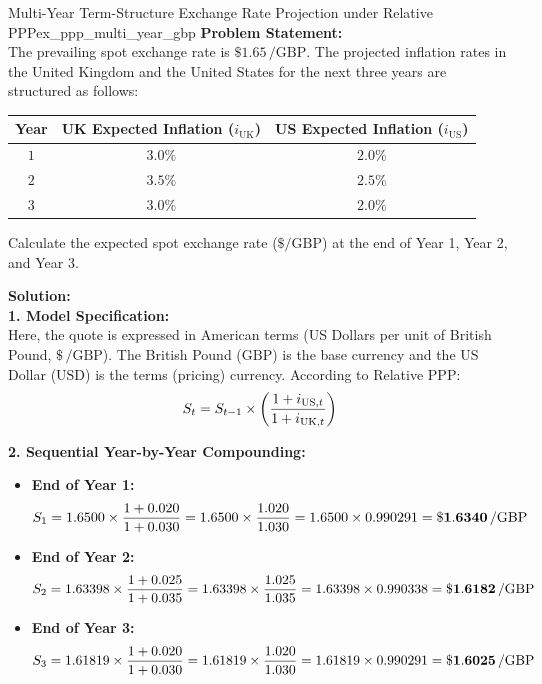 \clearpage
\begin{example}{Multi-Year Term-Structure Exchange Rate Projection under Relative PPP}{ex_ppp_multi_year_gbp}
\textbf{Problem Statement:}\\
The prevailing spot exchange rate is $\$1.65\,/\text{GBP}$. The projected inflation rates in the United Kingdom and the United States for the next three years are structured as follows:
\begin{center}
\small
\begin{tabular}{ccc}
    \toprule
    \textbf{Year} & \textbf{UK Expected Inflation ($i_{\text{UK}}$)} & \textbf{US Expected Inflation ($i_{\text{US}}$)} \\
    \midrule
    $1$ & $3.0\%$ & $2.0\%$ \\
    $2$ & $3.5\%$ & $2.5\%$ \\
    $3$ & $3.0\%$ & $2.0\%$ \\
    \bottomrule
\end{tabular}
\end{center}
Calculate the expected spot exchange rate ($\$/\text{GBP}$) at the end of Year 1, Year 2, and Year 3.

\tcblower
\textbf{Solution:}\\
\noindent\textbf{1. Model Specification:}\\
Here, the quote is expressed in American terms (US Dollars per unit of British Pound, $\$\,/\text{GBP}$). The British Pound ($\text{GBP}$) is the base currency and the US Dollar ($\text{USD}$) is the terms (pricing) currency. According to Relative PPP:
\begin{equation*}
    S_t = S_{t-1} \times \left( \frac{1 + i_{\text{US}, t}}{1 + i_{\text{UK}, t}} \right)
\end{equation*}

\noindent\textbf{2. Sequential Year-by-Year Compounding:}
\begin{itemize}[leftmargin=*]
    \item \textbf{End of Year 1:}
    \begin{equation*}
        S_1 = 1.6500 \times \frac{1 + 0.020}{1 + 0.030} = 1.6500 \times \frac{1.020}{1.030} = 1.6500 \times 0.990291 = \mathbf{\$1.6340\,/\text{GBP}}
    \end{equation*}
    \item \textbf{End of Year 2:}
    \begin{equation*}
        S_2 = 1.63398 \times \frac{1 + 0.025}{1 + 0.035} = 1.63398 \times \frac{1.025}{1.035} = 1.63398 \times 0.990338 = \mathbf{\$1.6182\,/\text{GBP}}
    \end{equation*}
    \item \textbf{End of Year 3:}
    \begin{equation*}
        S_3 = 1.61819 \times \frac{1 + 0.020}{1 + 0.030} = 1.61819 \times \frac{1.020}{1.030} = 1.61819 \times 0.990291 = \mathbf{\$1.6025\,/\text{GBP}}
    \end{equation*}
\end{itemize}


\end{example}
